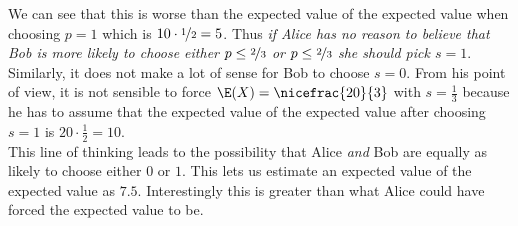 \documentclass{article}
\begin{document}
We can see that this is worse than the expected value of the
expected value when choosing $p=1$ which is $10\cdot\nicefrac{1}{2}=5$.
Thus \emph{if Alice has no reason to believe that Bob is more likely
  to choose either $p\leq\nicefrac{2}{3}$ or $p\leq\nicefrac{2}{3}$
  she should pick $s=1$}.\\
Similarly, it does not make a lot of sense for Bob to choose $s=0$.
From his point of view, it is not sensible to force
$\E(X)=\nicefrac{20}{3}$ with $s=\frac{1}{3}$ because he has to
assume that the expected value of the expected value
after choosing $s=1$ is $20\cdot \frac{1}{2}=10$.\\
This line of thinking leads to the possibility that Alice \emph{and}
Bob are equally as likely to choose either $0$ or $1$. This lets us
estimate an expected value of the expected value as $7.5$. Interestingly
this is greater than what Alice could have forced the expected value to
be.
\end{document}
